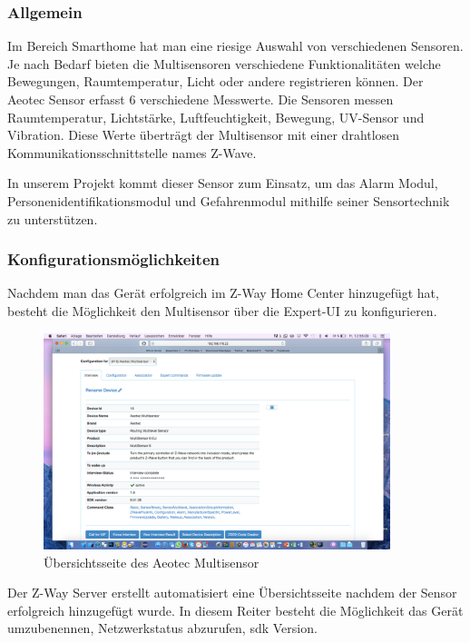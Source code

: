 \subsubsection{Allgemein}

Im Bereich Smarthome hat man eine riesige Auswahl von verschiedenen Sensoren. Je nach Bedarf bieten die Multisensoren verschiedene Funktionalitäten welche Bewegungen, Raumtemperatur, Licht oder andere registrieren können. Der Aeotec Sensor erfasst 6 verschiedene Messwerte. Die Sensoren messen Raumtemperatur, Lichtstärke, Luftfeuchtigkeit, Bewegung, UV-Sensor und Vibration. Diese Werte überträgt der Multisensor mit einer drahtlosen Kommunikationsschnittstelle names Z-Wave.

In unserem Projekt kommt dieser Sensor zum Einsatz, um das Alarm Modul, Personenidentifikationsmodul und Gefahrenmodul mithilfe seiner Sensortechnik zu unterstützen.


\subsubsection{Konfigurationsmöglichkeiten}

Nachdem man das Gerät erfolgreich im Z-Way Home Center hinzugefügt hat, besteht die Möglichkeit den Multisensor über die Expert-UI zu konfigurieren.

\begin{figure}[h!]
	\centering
	\includegraphics[width=0.9\textwidth]{img/Sensorevaluation/AeoScreenshot.png}
	\caption{Übersichtsseite des Aeotec Multisensor}
	\label{fig:sensorenAeoScreenshot}
\end{figure}

Der Z-Way Server erstellt automatisiert eine Übersichtsseite nachdem der Sensor erfolgreich hinzugefügt wurde. In diesem Reiter besteht die Möglichkeit das Gerät umzubenennen, Netzwerkstatus abzurufen, \gls{sdk} Version.

